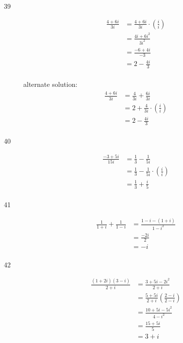\documentclass{exam}
\begin{document}
\begin{description}
    \item[39] 
      \begin{align*}
        \frac{4 + 6i}{3i} &= \frac{4 + 6i}{3i} \cdot \left( \frac{i}{i} \right) \\
                          &= \frac{4i + 6i^2}{3i^2} \\
                          &= \frac{-6 + 4i}{-3} \\
                          &= \boxed{2 - \frac{4i}{3}} \\
      \end{align*}

      alternate solution:
      \begin{align*}
        \frac{4 + 6i}{3i} &= \frac{4}{3i} + \frac{6i}{3i} \\
                          &= 2 + \frac{4}{3i} \cdot \left( \frac{i}{i} \right) \\
                          &= \boxed{2 - \frac{4i}{3}} \\
      \end{align*}

    \item[40] 
      \begin{align*}
        \frac{-3 + 5i}{15i} &= \frac{1}{3} - \frac{1}{5i} \\
                            &= \frac{1}{3}  - \frac{1}{5i} \cdot \left( \frac{i}{i} \right) \\
                            &= \boxed{\frac{1}{3}  + \frac{i}{5}} \\
      \end{align*}

    \item[41] 
      \begin{align*}
        \frac{1}{1 + i} + \frac{1}{1 - i} &= \frac{1 - i - (1 + i)}{1 - i^2} \\
        &= \frac{-2i}{2} \\
        &= \boxed{-i} \\
      \end{align*}

    \item[42] 
      \begin{align*}
        \frac{(1 + 2i)(3 - i)}{2 + i} &= \frac{3 + 5i - 2i^2}{2 + i} \\
                                      &= \frac{5 + 5i}{2 + i} \left( \frac{2 - i}{2 - i} \right) \\
                                      &= \frac{10 + 5i - 5i^2}{4 - i^2}  \\
                                      &= \frac{15 + 5i}{5}  \\
                                      &= \boxed{3 + i} \\
      \end{align*}


\end{description}
\end{document}
